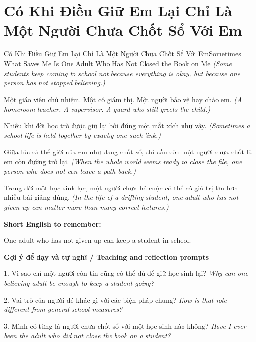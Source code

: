 \section{Có Khi Điều Giữ Em Lại Chỉ Là Một Người Chưa Chốt Sổ Với Em}
\begin{truyen}{Có Khi Điều Giữ Em Lại Chỉ Là Một Người Chưa Chốt Sổ Với Em}{Sometimes What Saves Me Is One Adult Who Has Not Closed the Book on Me}
\textit{(Some students keep coming to school not because everything is okay, but because one person has not stopped believing.)}

Một giáo viên chủ nhiệm. Một cô giám thị. Một người bảo vệ hay chào em.
\textit{(A homeroom teacher. A supervisor. A guard who still greets the child.)}

Nhiều khi đời học trò được giữ lại bởi đúng một mắt xích như vậy.
\textit{(Sometimes a school life is held together by exactly one such link.)}

Giữa lúc cả thế giới của em như đang chốt sổ, chỉ cần còn một người chưa chốt là em còn đường trở lại.
\textit{(When the whole world seems ready to close the file, one person who does not can leave a path back.)}

\end{truyen}

\begin{baihoc}
Trong đời một học sinh lạc, một người chưa bỏ cuộc có thể có giá trị lớn hơn nhiều bài giảng đúng.
\textit{(In the life of a drifting student, one adult who has not given up can matter more than many correct lectures.)}
\end{baihoc}

\begin{ghinhoanh}
\textbf{Short English to remember:}

One adult who has not given up can keep a student in school.

\end{ghinhoanh}

\begin{tuhocnhanh}
\textbf{Gợi ý để dạy và tự nghĩ / Teaching and reflection prompts}

1. Vì sao chỉ một người còn tin cũng có thể đủ để giữ học sinh lại? \textit{Why can one believing adult be enough to keep a student going?}

2. Vai trò của người đó khác gì với các biện pháp chung? \textit{How is that role different from general school measures?}

3. Mình có từng là người chưa chốt sổ với một học sinh nào không? \textit{Have I ever been the adult who did not close the book on a student?}
\end{tuhocnhanh}
